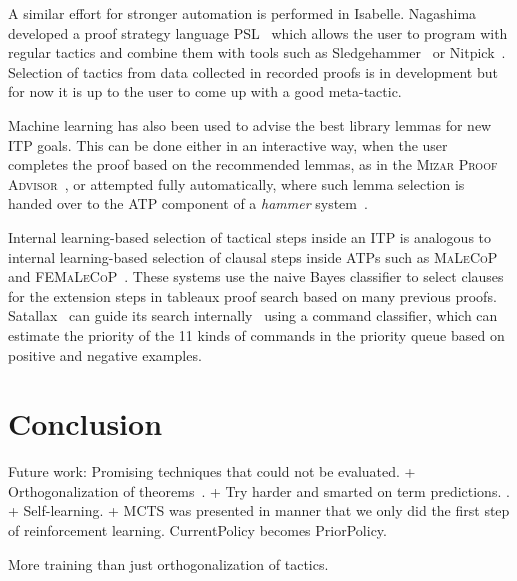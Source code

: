 \documentclass[runningheads,a4paper,draft]{svjour3}
\def\isabelle{\textsf{Isabelle}\xspace}
\def\hollight{\textsf{HOL Light}\xspace}
\def\sledgehammer{\textsf{Sledgehammer}\xspace}
\begin{document}
A similar effort for stronger automation is performed in \isabelle. Nagashima 
developed a proof strategy language PSL~\cite{NagashimaK17psl} which allows the 
user to 
program with regular tactics and combine them with tools such as 
\sledgehammer~\cite{sledgehammer10} or Nitpick~\cite{Nitpick10}. 
Selection of tactics from data collected in recorded proofs is in development 
but for now it is up to the user to come up with a good meta-tactic.


Machine learning has also been used to advise the best library lemmas for new 
ITP goals.
This can be done either in an interactive way, when the user completes the 
proof based on the recommended lemmas, as in the \textsc{Mizar Proof 
Advisor}~\cite{Urb04-MPTP0}, or attempted fully automatically, where such lemma 
selection is handed over to the ATP component of a \emph{hammer} 
system~\cite{hammers4qed,tgck-cpp15,holyhammer,BlanchetteGKKU16,mizAR40}.

Internal learning-based selection of tactical steps inside an ITP is analogous 
to internal learning-based selection of clausal steps inside ATPs such as 
\textsc{MaLeCoP}~\cite{malecop} and \textsc{FEMaLeCoP}~\cite{femalecop}. These 
systems
use the naive Bayes classifier to  select clauses for the extension steps in
tableaux proof search based on many previous proofs. Satallax~\cite{Brown2012a} 
can guide its
search internally~\cite{mllax} using a command classifier, which can estimate 
the priority of the 11 kinds of
commands in the priority queue based on positive and negative examples.




\section{Conclusion}\label{sec:concl}

Future work:
  Promising techniques that could not be evaluated. 
  + Orthogonalization of theorems~\cite{ckju-jsc15}. 
  + Try harder and smarted on term predictions. \cite{latest-version-of-sepia}. 
  \cite{conjecturing}
  + Self-learning.  
+ MCTS was presented in manner that we only did the first step of reinforcement 
learning. CurrentPolicy becomes PriorPolicy.
 
More training than just orthogonalization of tactics.

\end{document}

